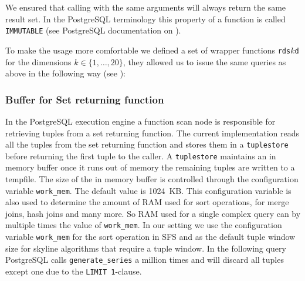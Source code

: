 We ensured that calling  with the same
arguments will always return the same result set. In the PostgreSQL
terminology this property of a function is called \texttt{IMMUTABLE}
(see PostgreSQL documentation on
).

To make the usage more comfortable we defined a set of wrapper
functions \texttt{rds$k$d} for the dimensions $k \in \{1, \ldots,
20\}$, they allowed us to issue the same queries as above in the
following way (see ):

\begin{interactive}
\ellipsis{}

\ellipsis{}

\ellipsis{}
\end{interactive}


\subsubsection{Buffer for Set returning function}

In the PostgreSQL execution engine a function scan node is responsible
for retrieving tuples from a set returning function. The current
implementation reads all the tuples from the set returning function
and stores them in a \texttt{tuplestore} before returning the first
tuple to the caller. A \texttt{tuplestore} maintains an in memory
buffer once it runs out of memory the remaining tuples are written to
a tempfile. The size of the in memory buffer is controlled through the
configuration variable \texttt{work\_mem}. The default value is
1024~KB. This configuration variable is also used to determine the amount
of RAM used for sort operations, for merge joins, hash joins and many more.
So RAM used for a single complex query can by multiple times the value of 
\texttt{work\_mem}.
In our setting we use the configuration variable \texttt{work\_mem}
for the sort operation in SFS and as the default tuple window size for
skyline algorithms that require a tuple window. In the following query
PostgreSQL calls \texttt{generate\_series} a million times and will
discard all tuples except one due to the
\texttt{LIMIT 1}-clause.

